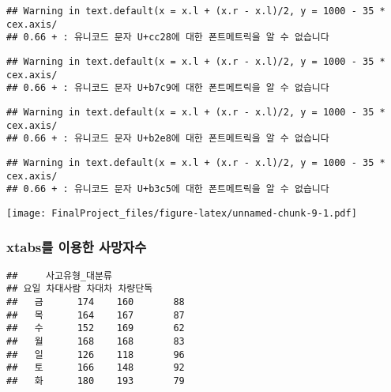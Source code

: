 \documentclass[]{article}
\newenvironment{Shaded}{\begin{snugshade}}{\end{snugshade}}
\newcommand{\KeywordTok}[1]{\textcolor[rgb]{0.13,0.29,0.53}{\textbf{#1}}}
\newcommand{\DataTypeTok}[1]{\textcolor[rgb]{0.13,0.29,0.53}{#1}}
\newcommand{\StringTok}[1]{\textcolor[rgb]{0.31,0.60,0.02}{#1}}
\newcommand{\OperatorTok}[1]{\textcolor[rgb]{0.81,0.36,0.00}{\textbf{#1}}}
\newcommand{\NormalTok}[1]{#1}
\begin{document}
\begin{verbatim}
## Warning in text.default(x = x.l + (x.r - x.l)/2, y = 1000 - 35 * cex.axis/
## 0.66 + : 유니코드 문자 U+cc28에 대한 폰트메트릭을 알 수 없습니다
\end{verbatim}

\begin{verbatim}
## Warning in text.default(x = x.l + (x.r - x.l)/2, y = 1000 - 35 * cex.axis/
## 0.66 + : 유니코드 문자 U+b7c9에 대한 폰트메트릭을 알 수 없습니다
\end{verbatim}

\begin{verbatim}
## Warning in text.default(x = x.l + (x.r - x.l)/2, y = 1000 - 35 * cex.axis/
## 0.66 + : 유니코드 문자 U+b2e8에 대한 폰트메트릭을 알 수 없습니다
\end{verbatim}

\begin{verbatim}
## Warning in text.default(x = x.l + (x.r - x.l)/2, y = 1000 - 35 * cex.axis/
## 0.66 + : 유니코드 문자 U+b3c5에 대한 폰트메트릭을 알 수 없습니다
\end{verbatim}

\texttt{[image: FinalProject\_files/figure-latex/unnamed-chunk-9-1.pdf]}

\subsubsection{xtabs를 이용한 사망자수}\label{xtabs--}

\begin{Shaded}
\end{Shaded}

\begin{verbatim}
##     사고유형_대분류
## 요일 차대사람 차대차 차량단독
##   금      174    160       88
##   목      164    167       87
##   수      152    169       62
##   월      168    168       83
##   일      126    118       96
##   토      166    148       92
##   화      180    193       79
\end{verbatim}

\begin{Shaded}
\end{Shaded}
\end{document}
